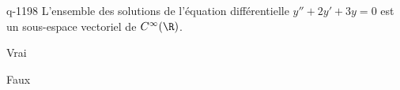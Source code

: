\begin{truefalse}{q-1198}
L'ensemble des solutions de l'équation différentielle $y'' + 2y' + 3y = 0$ est un sous-espace vectoriel de $C^\infty(\R)$.
\item* Vrai
\item Faux
\end{truefalse}

